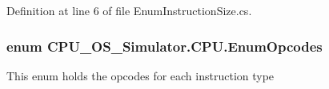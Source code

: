 Definition at line 6 of file Enum\+Instruction\+Size.\+cs.

\hypertarget{namespace_c_p_u___o_s___simulator_1_1_c_p_u_ac29c87bff87ad404c953b2581024043e}{}
\subsubsection[{Enum\+Opcodes}]{\setlength{\rightskip}{0pt plus 5cm}enum {\bf C\+P\+U\+\_\+\+O\+S\+\_\+\+Simulator.\+C\+P\+U.\+Enum\+Opcodes}\hspace{0.3cm}{\ttfamily [strong]}}\label{namespace_c_p_u___o_s___simulator_1_1_c_p_u_ac29c87bff87ad404c953b2581024043e}


This enum holds the opcodes for each instruction type 

